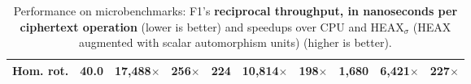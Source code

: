 {\begin{table*}[b]
\begin{scriptsize}
\begin{center}
\begin{tabular}{l|rrr|rrr|rrr}

        Hom. rot.
        &\textbf{40.0} %
        &17,488$\times$ %
        &256$\times$ %

        &\textbf{224} %
        &10,814$\times$ %
        &198$\times$ %

        &\textbf{1,680} %
        &6,421$\times$ %
        &227$\times$ %
        \\

        \bottomrule
      \end{tabular}
      \end{center}
      \caption{Performance on microbenchmarks: F1's \textbf{reciprocal throughput, in nanoseconds per ciphertext operation} (lower is better) and speedups over CPU and HEAX$_\sigma$ (HEAX augmented with scalar automorphism units) (higher is better).}
      \label{tbl:f1microbenchmark}
    \end{scriptsize}
  \end{table*}
}


